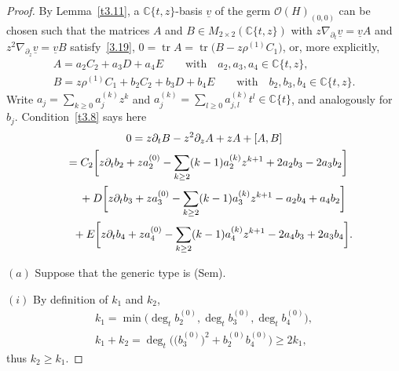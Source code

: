 \documentclass[10pt,a4paper]{amsart}
\numberwithin{equation}{section}
\numberwithin{figure}{section}
\newcommand{\C}{{\mathbb C}}
\newcommand{\OO}{{\mathcal O}}
\newcommand{\uuuu}{\underline}
\newcommand{\paa}{\partial}
\newcommand{\nnn}{\nabla}
\DeclareMathOperator{\tr}{tr}
\begin{document}
\begin{proof}
By Lemma~\ref{t3.11}, a $\C\{t,z\}$-basis $\uuuu{v}$
of the germ $\OO(H)_{(0,0)}$
can be chosen such that the matrices
$A$ and $B\in M_{2\times 2}(\C\{t,z\})$ with
$z\nnn_{\paa_t}\uuuu{v}=\uuuu{v} A$ and
$z^2\nnn_{\paa_z}\uuuu{v}=\uuuu{v} B$ satisfy~\eqref{3.19},
$0=\tr A=\tr\big(B-z\rho^{(1)} C_1\big)$, or, more explicitly,
\begin{gather*}
A= a_2C_2+a_3D+a_4E\qquad\text{with}\quad
a_2,a_3,a_4 \in \C\{t,z\},
\\
B= z\rho^{(1)}C_1+b_2C_2+b_3D+b_4E\qquad\text{with}\quad
b_2,b_3,b_4\in\C\{t,z\}.
\end{gather*}
Write $a_j=\sum_{k\geq 0}a_j^{(k)}z^k$ and
$a_j^{(k)}=\sum_{l\geq 0}a_{j,l}^{(k)}t^l\in\C\{t\}$,
and analogously for $b_j$.
Condition~\eqref{t3.8} says here
\begin{gather}
0= z\paa_tB-z^2\paa_z A + zA +[A,B]\nonumber
\\ \hphantom{0}
{}= C_2\bigg[ z\paa_t b_2 + za_2^{(0)} -
\sum_{k\geq 2}(k-1)a_2^{(k)}z^{k+1}+2a_2b_3-2a_3b_2\bigg]
\label{6.5}
\\ \hphantom{0=}
{}+ D\bigg[z\paa_tb_3 + za_3^{(0)} -
\sum_{k\geq 2}(k-1)a_3^{(k)}z^{k+1}-a_2b_4+a_4b_2\bigg]
\label{6.6}
\\ \hphantom{0=}
{}+E\bigg[ z\paa_t b_4 + za_4^{(0)} -
\sum_{k\geq 2}(k-1)a_4^{(k)}z^{k+1}-2a_4b_3+2a_3b_4\bigg].
\label{6.7}
\end{gather}

\medskip
$(a)$ Suppose that the generic type is (Sem).

\medskip
$(i)$ By definition of $k_1$ and $k_2$,
\begin{gather}\label{6.8}
k_1 = \min\big(\deg_tb_2^{(0)},\deg_tb_3^{(0)},\deg_tb_4^{(0)}\big),
\\
k_1+k_2= \deg_t\big(\big(b_3^{(0)}\big)^2+b_2^{(0)}b_4^{(0)}\big)\geq 2k_1,
\label{6.9}
\end{gather}
thus $k_2\geq k_1$.


\end{proof}
\end{document}
